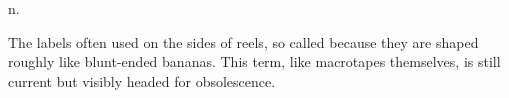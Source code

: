  n.

The labels often used on the sides of  reels, so called
because they are shaped roughly like blunt-ended bananas. This term, like
macrotapes themselves, is still current but visibly headed for obsolescence.

